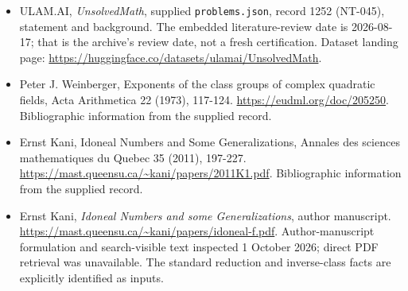 \documentclass[11pt,a4paper]{article}
\begin{document}
{\small

\begin{itemize}

\item[\hypertarget{source:1252:1}{S1}] ULAM.AI, \emph{UnsolvedMath}, supplied \texttt{problems.json}, record 1252 (NT-045), statement and background. The embedded literature-review date is 2026-08-17; that is the archive’s review date, not a fresh certification. Dataset landing page: \url{https://huggingface.co/datasets/ulamai/UnsolvedMath}.

\item[\hypertarget{source:1252:2}{S2}] Peter J. Weinberger, Exponents of the class groups of complex quadratic fields, Acta Arithmetica 22 (1973), 117-124. \url{https://eudml.org/doc/205250}. Bibliographic information from the supplied record.

\item[\hypertarget{source:1252:3}{S3}] Ernst Kani, Idoneal Numbers and Some Generalizations, Annales des sciences mathematiques du Quebec 35 (2011), 197-227. \url{https://mast.queensu.ca/~kani/papers/2011K1.pdf}. Bibliographic information from the supplied record.


\item[E1] Ernst Kani, \emph{Idoneal Numbers and some Generalizations},
author manuscript. \url{https://mast.queensu.ca/~kani/papers/idoneal-f.pdf}.
Author-manuscript formulation and search-visible text inspected
1 October 2026; direct PDF retrieval was unavailable. The standard
reduction and inverse-class facts are explicitly identified as inputs.

\end{itemize}

}

\label{end:1252}
\end{document}
